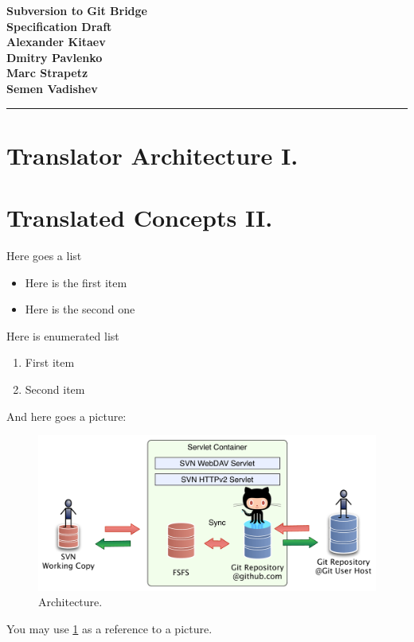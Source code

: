 \documentclass[aps,%
12pt,%
final,%
oneside,
onecolumn,%
superscriptaddress,%
centertags]{article} %
\begin{document}
\begin{titlepage}
\begin{center}

\textbf{\LARGE Subversion to Git Bridge} \\[1.0cm]
\textbf{\Large Specification Draft} \\[2.0cm]

\textbf{Alexander Kitaev} \\[1.0cm]
\textbf{Dmitry Pavlenko} \\[1.0cm]
\textbf{Marc Strapetz} \\[1.0cm]
\textbf{Semen Vadishev} \\[1.0cm]

\end{center}
\end{titlepage}

\topmargin=-10pt
\setcounter{page}{2}

\newpage
\hrule
\tableofcontents

\newpage
\section{Translator Architecture I.}





\section{Translated Concepts II.}







\newpage

Here goes a list\newline %
\begin{itemize}
	\item Here is the first item
	\item Here is the second one
\end{itemize}

Here is enumerated list\\ %
\begin{enumerate}
	\item First item
	\item Second item
\end{enumerate}

And here goes a picture:

\begin{figure}[!h]
\label{arch}
\centering
\includegraphics[width=\linewidth]{img/servlet/components_not_that_safe.pdf}
\caption{Architecture.}
\end{figure}

You may use \ref{arch} as a reference to a picture.
\end{document}
